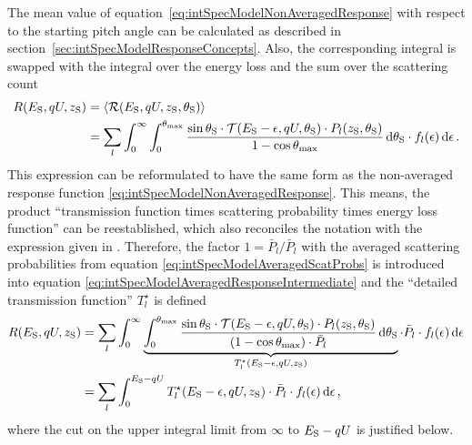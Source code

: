 The mean value of equation~\eqref{eq:intSpecModelNonAveragedResponse} with respect to the starting pitch angle can be calculated as described in section~\ref{sec:intSpecModelResponseConcepts}. Also, the corresponding integral is swapped with the integral over the energy loss and the sum over the scattering count
\begin{align}
\label{eq:intSpecModelAveragedResponseIntermediate}
R(E_\mathrm{S}, qU, z_\mathrm{S}) &= 
\left\langle{\mathcal{R}(E_\mathrm{S}, qU, z_\mathrm{S}, \theta_\mathrm{S})}\right\rangle \nonumber\\ &=
\sum_{l}
	\int_{0}^{\infty}
	\int_{0}^{\theta_\mathrm{max}}
		\frac{
			\sin\theta_\mathrm{S} \cdot
			\mathcal{T}(E_\mathrm{S}-\epsilon, qU, \theta_\mathrm{S}) \cdot P_l(z_\mathrm{S}, \theta_\mathrm{S})
		}{
			1-\cos\theta_\mathrm{max}
		}
	\mathop{}\!\mathrm{d} \theta_\mathrm{S}
	\cdot f_l(\epsilon)
	\mathop{}\!\mathrm{d} \epsilon
\text{\,.}
\end{align}
This expression can be reformulated to have the same form as the non-averaged response function \eqref{eq:intSpecModelNonAveragedResponse}. This means, the product ``transmission function times scattering probability times energy loss function'' can be reestablished, which also reconciles the notation  with the expression given in \cite{Groh2015}. Therefore, the factor $1=\bar{P}_l/\bar{P}_l$ with the averaged scattering probabilities from equation \eqref{eq:intSpecModelAveragedScatProbs} is introduced into equation \eqref{eq:intSpecModelAveragedResponseIntermediate} and the ``detailed transmission function'' $T_l^{\star}$ is defined
\begin{align}
	R(\Esource, qU, \zSource) &=
	\sum_{l}
	\int_{0}^{\infty}
	\underbrace{
		\int_{0}^{\thetaMax}
		\frac{
			\sin\thetaSource \cdot
			\mathcal{T}(\Esource-\epsilon, qU, \thetaSource) \cdot P_l(\zSource, \thetaSource)
		}{
			(1-\cos\thetaMax) \cdot \bar{P}_l \vphantom{\text{\large A}}
		}
		\d \thetaSource
	}_{
		T_l^{\star}(\Esource-\epsilon,qU,\zSource)
	}
	\cdot \bar{P}_l \cdot f_l(\epsilon)
	\d \epsilon \nonumber \\ &=
	\label{eq:intSpecModelFullResponseIntermediate}
	\sum_{l}
	\int_{0}^{\Esource-qU}
	T_l^{\star}(\Esource-\epsilon,qU,\zSource)
	\cdot \bar{P}_l \cdot f_l(\epsilon)
	\d \epsilon
	\comma
\end{align}
where the cut on the upper integral limit from $\infty$ to $E_\mathrm{S}-qU$ is justified below.

